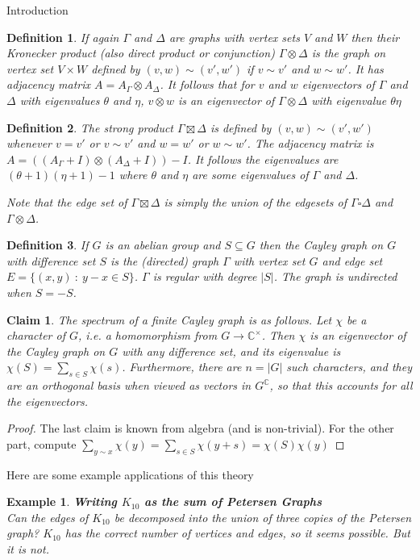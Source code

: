 \documentclass{article}
\newcommand{\C}{\mathbb C}
\newtheorem{claim}{Claim}
\newtheorem{defn}{Definition}
\newtheorem{example}{Example}
\begin{document}
\begin{section}{Introduction}
   \begin{defn}
     If again $\Gamma$ and $\Delta$ are graphs with vertex sets $V$ and $W$ then their \emph{Kronecker product} (also \emph{direct product} or \emph{conjunction}) $\Gamma \otimes \Delta$ is the graph on vertex set $V \times W$ defined by $(v,w) \sim (v',w')$ if $v \sim v'$ and $w \sim w'$.
     It has adjacency matrix $A = A_\Gamma \otimes A_\Delta$.
     It follows that for $v$ and $w$ eigenvectors of $\Gamma$ and $\Delta$ with eigenvalues $\theta$ and $\eta$, $v \otimes w$ is an eigenvector of $\Gamma \otimes \Delta$ with eigenvalue $\theta\eta$
   \end{defn}
   \begin{defn}
     The strong product $\Gamma \boxtimes \Delta$ is defined by $(v,w) \sim (v',w')$ whenever $v=v'$ or $v \sim v'$ and $w=w'$ or $w \sim w'$.
     The adjacency matrix is $A = ((A_\Gamma + I) \otimes (A_\Delta + I)) - I$.
     It follows the eigenvalues are $(\theta+1)(\eta+1)-1$ where $\theta$ and $\eta$ are some eigenvalues of $\Gamma$ and $\Delta$.

     Note that the edge set of $\Gamma \boxtimes \Delta$ is simply the union of the edgesets of $\Gamma \square \Delta$ and $\Gamma \otimes \Delta$.
  \end{defn}

  \begin{defn}
    If $G$ is an abelian group and $S \subseteq G$ then the \emph{Cayley graph} on $G$ with difference set $S$ is the (directed) graph $\Gamma$ with vertex set $G$ and edge set $E = \{(x,y)~:~y-x\in S\}$.
    $\Gamma$ is regular with degree $|S|$.
    The graph is undirected when $S = -S$.
  \end{defn}
  \begin{claim}
    The spectrum of a finite Cayley graph is as follows.
    Let $\chi$ be a character of $G$, i.e. a homomorphism from $G \to \C^\times$.
    Then $\chi$ is an eigenvector of the Cayley graph on $G$ with any difference set, and its eigenvalue is $\chi(S) = \sum_{s \in S}\chi(s)$.
    Furthermore, there are $n = |G|$ such characters, and they are an orthogonal basis when viewed as vectors in $G^\C$, so that this accounts for all the eigenvectors.
  \end{claim}
  \begin{proof}
    The last claim is known from algebra (and is non-trivial).
    For the other part, compute $\sum_{y\sim x}\chi(y) = \sum_{s\in S} \chi(y+s) = \chi(S)\chi(y)$
  \end{proof}
  Here are some example applications of this theory
  \begin{example}{\textbf{Writing $K_{10}$ as the sum of Petersen Graphs}\\}
    Can the edges of $K_{10}$ be decomposed into the union of three copies of the Petersen graph?
    $K_{10}$ has the correct number of vertices and edges, so it seems possible.
    But it is not.


\end{example}
\end{section}
\end{document}
